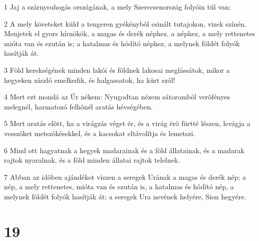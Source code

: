 \par 1 Jaj a szárnysuhogás országának, a mely Szerecsenország folyóin túl van;
\par 2 A mely követeket küld a tengeren gyékénybõl csinált tutajokon, vizek színén. Menjetek el gyors hírnökök, a magas és derék néphez, a néphez, a mely rettenetes mióta van és ezután is; a hatalmas és hódító néphez, a melynek földét folyók hasítják át.
\par 3 Föld kerekségének minden lakói és földnek lakosai meglássátok, mikor a hegyeken zászló emelkedik, és halgassatok, ha kürt szól!
\par 4 Mert ezt mondá az Úr nékem: Nyugodtan nézem sátoromból verõfényes melegnél, harmatozó felhõnél aratás hévségében.
\par 5 Mert aratás elõtt, ha a virágzás véget ér, és a virág érõ fürtté lészen, levágja a vesszõket metszõkésekkel, és a kacsokat eltávolítja és lemetszi.
\par 6 Mind ott hagyatnak a hegyek madarainak és a föld állatainak, és a madarak rajtok nyaralnak, és a föld minden állatai rajtok telelnek.
\par 7 Abban az idõben ajándékot viszen a seregek Urának a magas és derék nép; a nép, a mely rettenetes, mióta van és ezután is, a hatalmas és hódító nép, a melynek földét folyók hasítják át; a seregek Ura nevének helyére, Sion hegyére.

\chapter{19}

